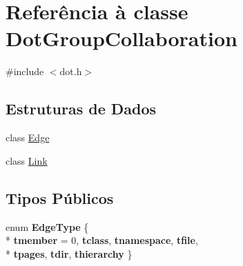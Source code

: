 \hypertarget{class_dot_group_collaboration}{\section{Referência à classe Dot\-Group\-Collaboration}
\label{class_dot_group_collaboration}
}


{\ttfamily \#include $<$dot.\-h$>$}

\subsection*{Estruturas de Dados}
\begin{DoxyCompactItemize}
\item 
class \hyperlink{class_dot_group_collaboration_1_1_edge}{Edge}
\item 
class \hyperlink{class_dot_group_collaboration_1_1_link}{Link}
\end{DoxyCompactItemize}
\subsection*{Tipos Públicos}
\begin{DoxyCompactItemize}
\item 
enum {\bfseries Edge\-Type} \{ \\*
{\bfseries tmember} = 0, 
{\bfseries tclass}, 
{\bfseries tnamespace}, 
{\bfseries tfile}, 
\\*
{\bfseries tpages}, 
{\bfseries tdir}, 
{\bfseries thierarchy}
 \}
\end{DoxyCompactItemize}
